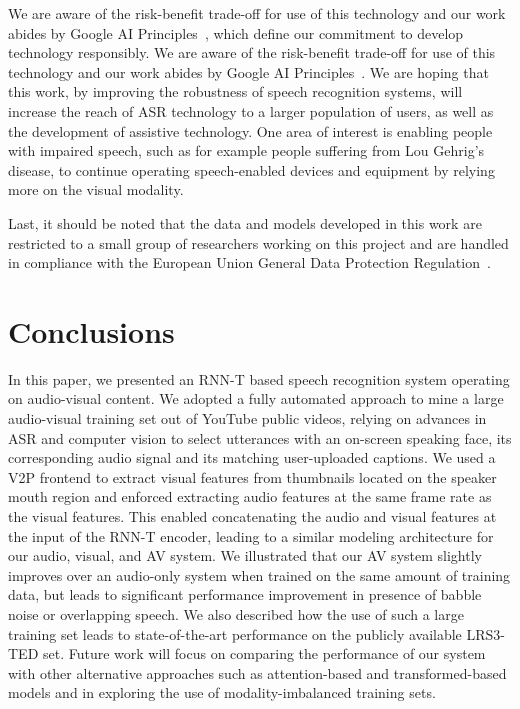 \documentclass{article}
\newcommand{\lrsted}{\textsc{LRS3-TED}\xspace}
\newcommand{\negsectionspace}{\vspace{-4pt}}
\begin{document}
\ifx\blindreview
We are aware of the risk-benefit trade-off for use of this technology
and our work abides by Google AI Principles~\citet{google:ai}, which
define our commitment to develop technology responsibly.
\else
We are aware of the risk-benefit trade-off for use of this technology
and our work abides by Google AI Principles~\citet{google:ai}.
\fi
We are hoping
that this work, by improving the robustness of speech recognition
systems, will increase the reach of ASR technology to a larger
population of users, as well as the development of assistive
technology. One area of interest is enabling people with impaired
speech, such as for example people suffering from Lou Gehrig's
disease, to continue operating speech-enabled devices and equipment
by relying more on the visual modality.

Last, it should be noted that the data and models developed in this
work are restricted to a small group of researchers working on this
project and are handled in compliance with the European Union General
Data Protection Regulation~\citet{gdpr}.


\negsectionspace
\section{Conclusions}
\label{Conclusions}
\negsectionspace
In this paper, we presented an RNN-T based speech recognition system
operating on audio-visual content. We adopted a fully automated
approach to mine a large audio-visual training set out of YouTube
public videos, relying on advances in ASR and computer vision to
select utterances with an on-screen speaking face, its corresponding
audio signal and its matching user-uploaded captions. We used a V2P
frontend to extract visual features from thumbnails located on the
speaker mouth region and enforced extracting audio features at the
same frame rate as the visual features. This enabled concatenating the
audio and visual features at the input of the RNN-T encoder, leading
to a similar modeling architecture for our audio, visual, and AV
system.  We illustrated that our AV system slightly improves over an
audio-only system when trained on the same amount of training data,
but leads to significant performance improvement in presence of babble
noise or overlapping speech. We also described how the use of such a
large training set leads to state-of-the-art performance on the
publicly available \lrsted set. Future work will focus on comparing
the performance of our system with other alternative approaches such
as attention-based and transformed-based models and in exploring the
use of modality-imbalanced training sets.



\label{endofmaintext}



\end{document}
